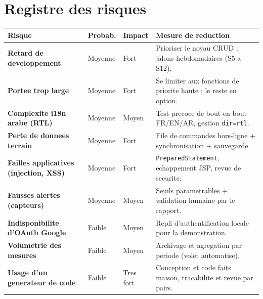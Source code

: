 \section{Registre des risques}
\begin{longtable}{>{\bfseries}p{4.6cm} C{1.8cm} C{1.6cm} p{5.4cm}}
\toprule
\textbf{Risque} & \textbf{Probab.} & \textbf{Impact} & \textbf{Mesure de reduction} \\
\midrule
\endhead
Retard de developpement       & Moyenne & Fort      & Prioriser le noyau CRUD ; jalons hebdomadaires (S5 a S12). \\
Portee trop large             & Moyenne & Fort      & Se limiter aux fonctions de priorite haute ; le reste en option. \\
Complexite i18n arabe (RTL)   & Moyenne & Moyen     & Test precoce de bout en bout FR/EN/AR, gestion \texttt{dir=rtl}. \\
Perte de donnees terrain      & Moyenne & Fort      & File de commandes hors-ligne + synchronisation + sauvegarde. \\
Failles applicatives (injection, XSS) & Moyenne & Fort & \texttt{PreparedStatement}, echappement JSP, revue de securite. \\
Fausses alertes (capteurs)    & Moyenne & Moyen     & Seuils parametrables + validation humaine par le rapport. \\
Indisponibilite d'OAuth Google & Faible & Moyen     & Repli d'authentification locale pour la demonstration. \\
Volumetrie des mesures        & Faible  & Moyen     & Archivage et agregation par periode (volet automatise). \\
Usage d'un generateur de code & Faible  & Tres fort & Conception et code faits maison, tracabilite et revue par pairs. \\
\bottomrule
\end{longtable}

